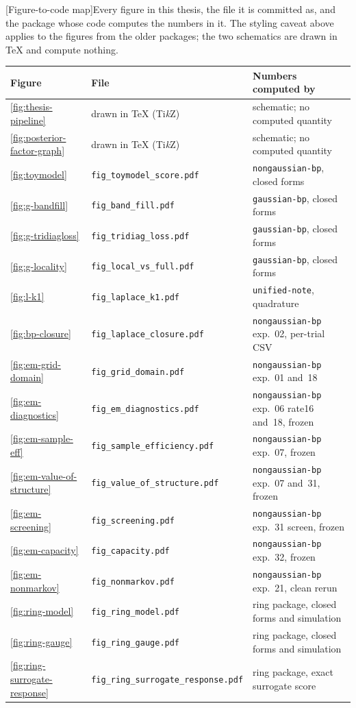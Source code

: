 \begin{center}
\begin{minipage}{\linewidth}\small\centering
{}[Figure-to-code map]{Every figure in this thesis, the file it is committed as, and the package whose code computes the numbers in it. The styling caveat above applies to the figures from the older packages; the two schematics are drawn in \TeX{} and compute nothing.}
\label{tab:figure-map}
\begin{tabular}{@{}lll@{}}
\toprule
Figure & File & Numbers computed by \\
\midrule
\ref{fig:thesis-pipeline} & drawn in \TeX{} (Ti\emph{k}Z) & schematic; no computed quantity \\
\ref{fig:posterior-factor-graph} & drawn in \TeX{} (Ti\emph{k}Z) & schematic; no computed quantity \\
\ref{fig:toymodel} & \texttt{fig\_toymodel\_score.pdf} & \texttt{nongaussian-bp}, closed forms \\
\ref{fig:g-bandfill} & \texttt{fig\_band\_fill.pdf} & \texttt{gaussian-bp}, closed forms \\
\ref{fig:g-tridiagloss} & \texttt{fig\_tridiag\_loss.pdf} & \texttt{gaussian-bp}, closed forms \\
\ref{fig:g-locality} & \texttt{fig\_local\_vs\_full.pdf} & \texttt{gaussian-bp}, closed forms \\
\ref{fig:l-k1} & \texttt{fig\_laplace\_k1.pdf} & \texttt{unified-note}, quadrature \\
\ref{fig:bp-closure} & \texttt{fig\_laplace\_closure.pdf} & \texttt{nongaussian-bp} exp.~02, per-trial CSV \\
\ref{fig:em-grid-domain} & \texttt{fig\_grid\_domain.pdf} & \texttt{nongaussian-bp} exp.~01 and~18 \\
\ref{fig:em-diagnostics} & \texttt{fig\_em\_diagnostics.pdf} & \texttt{nongaussian-bp} exp.~06 rate16 and~18, frozen \\
\ref{fig:em-sample-eff} & \texttt{fig\_sample\_efficiency.pdf} & \texttt{nongaussian-bp} exp.~07, frozen \\
\ref{fig:em-value-of-structure} & \texttt{fig\_value\_of\_structure.pdf} & \texttt{nongaussian-bp} exp.~07 and~31, frozen \\
\ref{fig:em-screening} & \texttt{fig\_screening.pdf} & \texttt{nongaussian-bp} exp.~31 screen, frozen \\
\ref{fig:em-capacity} & \texttt{fig\_capacity.pdf} & \texttt{nongaussian-bp} exp.~32, frozen \\
\ref{fig:em-nonmarkov} & \texttt{fig\_nonmarkov.pdf} & \texttt{nongaussian-bp} exp.~21, clean rerun \\
\ref{fig:ring-model} & \texttt{fig\_ring\_model.pdf} & ring package, closed forms and simulation \\
\ref{fig:ring-gauge} & \texttt{fig\_ring\_gauge.pdf} & ring package, closed forms and simulation \\
\ref{fig:ring-surrogate-response} & \texttt{fig\_ring\_surrogate\_response.pdf} & ring package, exact surrogate score \\
\bottomrule
\end{tabular}


\end{minipage}
\end{center}
